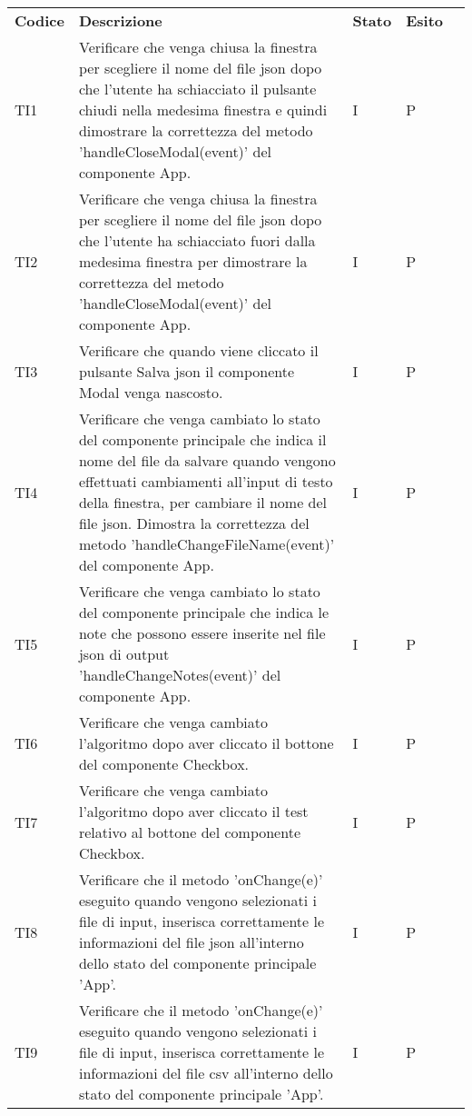 \begin{longtable} {
		>{}p{15mm} 
		>{}p{79.5mm}
		>{}p{15mm} 
		>{}p{15mm}
		>{}p{0mm}}
	\rowcolor{gray!50}
	\textbf{Codice} & \textbf{Descrizione} & \textbf{Stato} & \textbf{Esito} &\TBstrut \\
	TI1      &  Verificare che venga chiusa la finestra per scegliere il nome del file json dopo che l'utente ha schiacciato il pulsante chiudi nella medesima finestra e quindi dimostrare la correttezza del metodo 'handleCloseModal(event)' del componente App.& I & P  &\TBstrut \\ [2mm]
	TI2      &  Verificare che venga chiusa la finestra per scegliere il nome del file json dopo che l’utente ha schiacciato fuori dalla medesima finestra per dimostrare la correttezza del metodo 'handleCloseModal(event)' del componente App.& I & P  &\TBstrut \\ [2mm]
	TI3      &  Verificare che quando viene cliccato il pulsante Salva json il componente Modal venga nascosto.& I & P  &\TBstrut \\ [2mm]
	TI4      &  Verificare che venga cambiato lo stato del componente principale che indica il nome del file da salvare quando vengono effettuati cambiamenti all'input di testo della finestra, per cambiare il nome del file json. Dimostra la correttezza del metodo 'handleChangeFileName(event)' del componente App.& I & P  &\TBstrut \\ [2mm]
	TI5      &  Verificare che venga cambiato lo stato del componente principale che indica le note che possono essere inserite nel file json di output 'handleChangeNotes(event)' del componente App.& I & P  &\TBstrut \\ [2mm]
	TI6      &  Verificare che venga cambiato l'algoritmo dopo aver cliccato il bottone del componente Checkbox.& I & P  &\TBstrut \\ [2mm]
	TI7      &  Verificare che venga cambiato l'algoritmo dopo aver cliccato il test relativo al bottone del componente Checkbox.& I & P  &\TBstrut \\ [2mm]
	TI8      &  Verificare che il metodo 'onChange(e)' eseguito quando vengono selezionati i file di input, inserisca correttamente le informazioni del file json all'interno dello stato del componente principale 'App'.& I & P  &\TBstrut \\ [2mm]
	TI9      &  Verificare che il metodo 'onChange(e)' eseguito quando vengono selezionati i file di input, inserisca correttamente le informazioni del file csv all'interno dello stato del componente principale 'App'.& I & P  &\TBstrut \\ [2mm]

\end{longtable}
